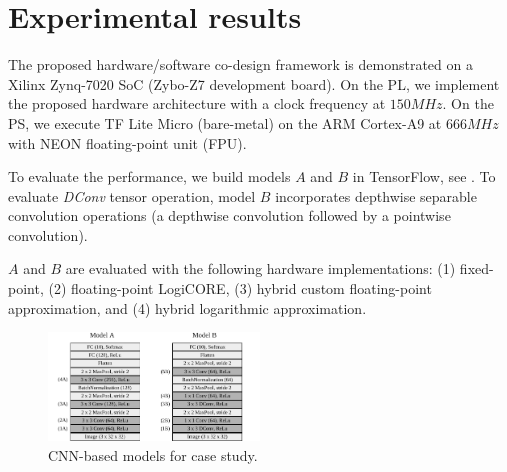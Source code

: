 \section{Experimental results}
\label{sec:experimental_results}
The proposed hardware/software co-design framework is demonstrated on a Xilinx Zynq-7020 SoC (Zybo-Z7 development board). On the PL, we implement the proposed hardware architecture with a clock frequency at $150 MHz$. On the PS, we execute TF Lite Micro (bare-metal) on the ARM Cortex-A9 at $666MHz$ with NEON floating-point unit (FPU)\cite{xilinx2015zynq}.

To evaluate the performance, we build models $A$ and $B$ in TensorFlow, see . To evaluate \emph{DConv} tensor operation, model $B$ incorporates depthwise separable convolution operations (a depthwise convolution followed by
a pointwise convolution).

$A$ and $B$ are evaluated with the following hardware implementations:
(1) fixed-point, (2) floating-point LogiCORE, (3) hybrid custom floating-point approximation, and (4) hybrid logarithmic approximation.


\begin{figure}[t!]
	\centering
	\includegraphics[width=0.5\textwidth]{../figures/models.pdf}
	\caption{CNN-based models for case study.}
	\label{fig:models}
\end{figure}

